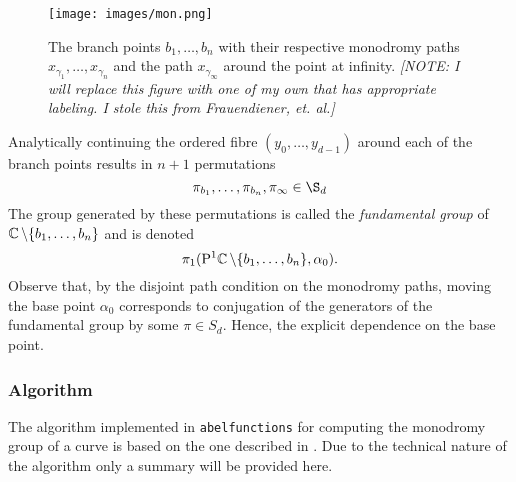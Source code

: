 \begin{figure}
  \centering
  \texttt{[image: images/mon.png]}
  \caption{The branch points $b_1,\ldots,b_n$ with their respective
    monodromy paths $x_{\gamma_1}, \ldots, x_{\gamma_n}$ and the path
    $x_{\gamma_\infty}$ around the point at infinity. {\it [NOTE: I will
        replace this figure with one of my own that has appropriate
        labeling. I stole this from Frauendiener, et. al.]}}
  \label{fig: mon}
\end{figure}

Analytically continuing the ordered fibre $(y_0, \ldots, y_{d-1})$
around each of the branch points results in $n+1$ permutations
\[
    \pi_{b_1}, \ldots, \pi_{b_n}, \pi_\infty \in \S_d
\]
The group generated by these permutations is called the {\it fundamental
  group} of $\operatorname{\mathbb{C}} \backslash \{b_1, \ldots, b_n\}$ and is denoted
\[
    \pi_1(\mathrm{P}^1 \!\operatorname{\mathbb{C}} \backslash \{b_1, \ldots, b_n\}, \alpha_0).
\]
Observe that, by the disjoint path condition on the monodromy paths,
moving the base point $\alpha_0$ corresponds to conjugation of the
generators of the fundamental group by some $\pi \in S_d$. Hence, the
explicit dependence on the base point.


%
\subsubsection*{Algorithm}
%

The algorithm implemented in {\tt abelfunctions} for computing the
monodromy group of a curve is based on the one described in
\cite{FKS12}. Due to the technical nature of the algorithm only a
summary will be provided here.

